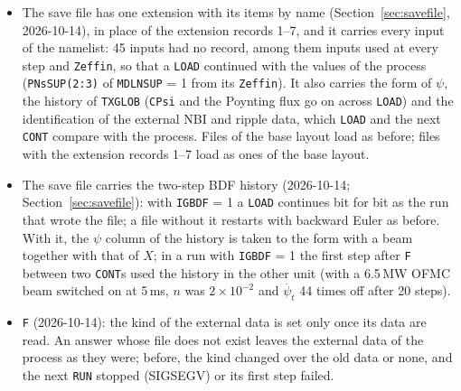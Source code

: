 \documentclass[11pt]{article}
\def\psit{\psi_t}
\def\psitd{\dot{\psit}}
\begin{document}
\begin{itemize}
  the form of the file, and with \texttt{F} before \texttt{LOAD} a file without a beam was continued in
  the form without one until the next parameter input: the same solution as with \texttt{F} after
  \texttt{LOAD}, with other rounding ($10^{-8}$).  Now the two orders agree bit for bit; without
  \texttt{F} nothing changes.
\item The save file has one extension with its items by name (Section~\ref{sec:savefile},
  2026-10-14), in place of the extension records 1--7, and it carries every input of the namelist:
  45 inputs had no record, among them inputs used at every step and \texttt{Zeffin}, so that a
  \texttt{LOAD} continued with the values of the process (\texttt{PNsSUP(2:3)} of
  \texttt{MDLNSUP} = 1 from its \texttt{Zeffin}).  It also carries the form of $\psi$, the history
  of \texttt{TXGLOB} (\texttt{CPsi} and the Poynting flux go on across \texttt{LOAD}) and the
  identification of the external NBI and ripple data, which \texttt{LOAD} and the next
  \texttt{CONT} compare with the process.  Files of the base layout load as before; files with the
  extension records 1--7 load as ones of the base layout.
\item The save file carries the two-step BDF history (2026-10-14; Section~\ref{sec:savefile}): with
  \texttt{IGBDF} = 1 a \texttt{LOAD} continues bit for bit as the run that wrote the file; a file
  without it restarts with backward Euler as before.  With it, the $\psi$ column of the history is
  taken to the form with a beam together with that of $X$; in a run with \texttt{IGBDF} = 1 the first
  step after \texttt{F} between two \texttt{CONT}s used the history in the other unit (with a 6.5\,MW
  OFMC beam switched on at 5\,ms, $n$ was $2\times10^{-2}$ and $\psitd$ 44 times off after 20 steps).
\item \texttt{F} (2026-10-14): the kind of the external data is set only once its data are read.
  An answer whose file does not exist leaves the external data of the process as they were; before,
  the kind changed over the old data or none, and the next \texttt{RUN} stopped (SIGSEGV) or its
  first step failed.
\end{itemize}
\end{document}
